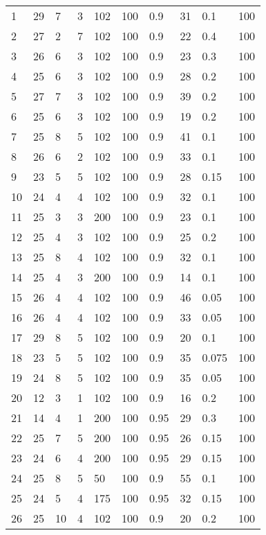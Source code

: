 \begin{center}
\begin{longtable}{l|lllllllll}
		1 & 29 & 7 & 3 & 102 & 100 & 0.9 & 31 & 0.1 & 100 \\ 
        2 & 27 & 2 & 7 & 102 & 100 & 0.9 & 22 & 0.4 & 100 \\ 
        3 & 26 & 6 & 3 & 102 & 100 & 0.9 & 23 & 0.3 & 100 \\ 
        4 & 25 & 6 & 3 & 102 & 100 & 0.9 & 28 & 0.2 & 100 \\ 
        5 & 27 & 7 & 3 & 102 & 100 & 0.9 & 39 & 0.2 & 100 \\ 
        6 & 25 & 6 & 3 & 102 & 100 & 0.9 & 19 & 0.2 & 100 \\ 
        7 & 25 & 8 & 5 & 102 & 100 & 0.9 & 41 & 0.1 & 100 \\ 
        8 & 26 & 6 & 2 & 102 & 100 & 0.9 & 33 & 0.1 & 100 \\ 
        9 & 23 & 5 & 5 & 102 & 100 & 0.9 & 28 & 0.15 & 100 \\ 
        10 & 24 & 4 & 4 & 102 & 100 & 0.9 & 32 & 0.1 & 100 \\ 
        11 & 25 & 3 & 3 & 200 & 100 & 0.9 & 23 & 0.1 & 100 \\ 
        12 & 25 & 4 & 3 & 102 & 100 & 0.9 & 25 & 0.2 & 100 \\ 
        13 & 25 & 8 & 4 & 102 & 100 & 0.9 & 32 & 0.1 & 100 \\ 
        14 & 25 & 4 & 3 & 200 & 100 & 0.9 & 14 & 0.1 & 100 \\ 
        15 & 26 & 4 & 4 & 102 & 100 & 0.9 & 46 & 0.05 & 100 \\ 
        16 & 26 & 4 & 4 & 102 & 100 & 0.9 & 33 & 0.05 & 100 \\ 
       	17 & 29 & 8 & 5 & 102 & 100 & 0.9 & 20 & 0.1 & 100 \\ 
        18 & 23 & 5 & 5 & 102 & 100 & 0.9 & 35 & 0.075 & 100 \\ 
        19 & 24 & 8 & 5 & 102 & 100 & 0.9 & 35 & 0.05 & 100 \\ 
        20 & 12 & 3 & 1 & 102 & 100 & 0.9 & 16 & 0.2 & 100 \\ 
        21 & 14 & 4 & 1 & 200 & 100 & 0.95 & 29 & 0.3 & 100 \\ 
        22 & 25 & 7 & 5 & 200 & 100 & 0.95 & 26 & 0.15 & 100 \\ 
        23 & 24 & 6 & 4 & 200 & 100 & 0.95 & 29 & 0.15 & 100 \\ 
        24 & 25 & 8 & 5 & 50 & 100 & 0.9 & 55 & 0.1 & 100 \\ 
        25 & 24 & 5 & 4 & 175 & 100 & 0.95 & 32 & 0.15 & 100 \\ 
        26 & 25 & 10 & 4 & 102 & 100 & 0.9 & 20 & 0.2 & 100 \\ 

\end{longtable}
\end{center}
